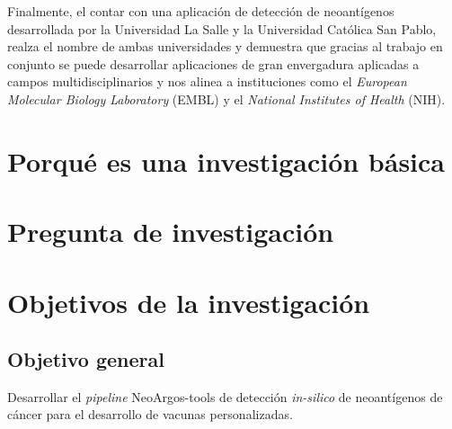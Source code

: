 \documentclass[a4paper,11pt]{article}
\begin{document}
Finalmente, el contar con una aplicación de detección de neoantígenos desarrollada por la Universidad La Salle y la Universidad Católica San Pablo, realza el nombre de ambas universidades y demuestra que gracias al trabajo en conjunto se puede desarrollar aplicaciones de gran envergadura aplicadas a campos multidisciplinarios y nos alinea a instituciones como el \textit{European Molecular Biology Laboratory} (EMBL) y el \textit{National Institutes of Health} (NIH).

\section{Porqué es una investigación básica}
	
\section{Pregunta de investigación}	
	
\section{Objetivos de la investigación}
	
	\subsection{Objetivo general}
	
	Desarrollar el \textit{pipeline} NeoArgos-tools de detección \textit{in-silico} de neoantígenos de cáncer para el desarrollo de vacunas personalizadas.
	
\end{document}
